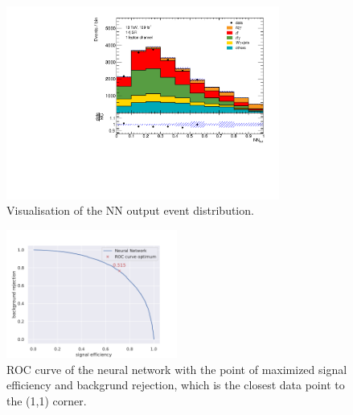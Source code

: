 \begin{figure}
    \centering
    \includegraphics[width=0.8\textwidth]{Plots/NN_out_mix_GANZ.pdf}
    \caption{Visualisation of the NN output event distribution.}
    \label{fig:NNdistro}
\end{figure}
\begin{figure}
    \centering
    \includegraphics[width=0.5\textwidth]{Plots/ROC-Curve-fullt.pdf}
    \caption{ROC curve of the neural network with the point of maximized signal efficiency and backgrund rejection, which is the closest data point to the (1,1) corner.}
    \label{fig:rocfull}
\end{figure}

